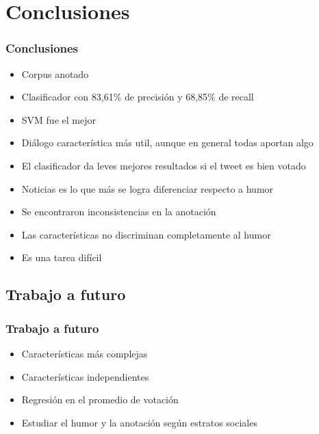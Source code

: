\section{Conclusiones}

\begin{frame}
    \frametitle{Conclusiones}
    
    \begin{itemize}[<+->]
    	\item[\checkmark] Corpus anotado
    	\item[\checkmark] Clasificador con 83,61\% de precisión y 68,85\% de recall
    	\item[\checkmark] SVM fue el mejor
    	\item[\checkmark] Diálogo característica más util, aunque en general todas aportan algo
    	\item[\checkmark] El clasificador da leves mejores resultados si el tweet es bien votado
    	\item[\checkmark] Noticias es lo que más se logra diferenciar respecto a humor
    	\item[\checkmark] Se encontraron inconsistencias en la anotación
    	\item[\checkmark] Las características no discriminan completamente al humor
    	\item[\checkmark] Es una tarea difícil
    \end{itemize}
\end{frame}

\subsection{Trabajo a futuro}
\begin{frame}
    \frametitle{Trabajo a futuro}
    
    \begin{itemize}[<+->]
    	\item Características más complejas
    	\item Características independientes
    	\item Regresión en el promedio de votación
    	\item Estudiar el humor y la anotación según estratos sociales
    \end{itemize}
\end{frame}
